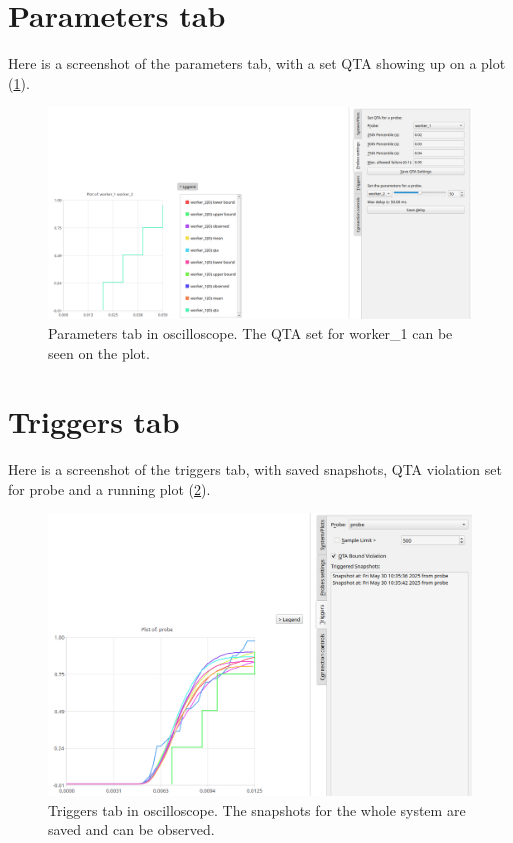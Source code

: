 \newpage

\section{Parameters tab} \label{app:param_tab}
    Here is a screenshot of the parameters tab, with a set QTA showing up on a plot (\cref{fig:param_tab}).

    \begin{figure}[H]
        \begin{center}
            \includegraphics[width = \textwidth]{img/save_qta_manual.png}
        \end{center}
        \caption{Parameters tab in oscilloscope. The QTA set for worker\_1 can be seen on the plot.}
        \label{fig:param_tab}
    \end{figure}

\newpage

\section{Triggers tab} \label{app:trig_tab}
    Here is a screenshot of the triggers tab, with saved snapshots, QTA violation set for probe and a running plot (\cref{fig:triggers_tab}).

   \begin{figure}[H]
        \begin{center}
            \includegraphics[width = \textwidth]{img/manual/triggers.png}
        \end{center}
        \caption{Triggers tab in oscilloscope. The snapshots for the whole system are saved and can be observed.}
        \label{fig:triggers_tab}
    \end{figure}

